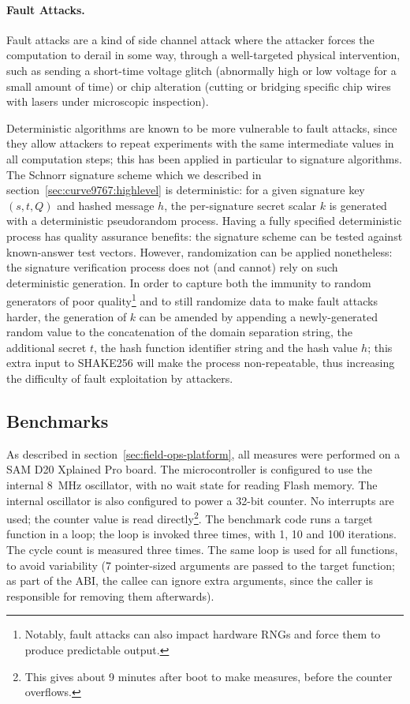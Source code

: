 \documentclass{llncs}
\begin{document}
\paragraph{Fault Attacks.}

Fault attacks are a kind of side channel attack where the attacker
forces the computation to derail in some way, through a well-targeted
physical intervention, such as sending a short-time voltage glitch
(abnormally high or low voltage for a small amount of time) or chip
alteration (cutting or bridging specific chip wires with lasers under
microscopic inspection).

Deterministic algorithms are known to be more vulnerable to fault
attacks, since they allow attackers to repeat experiments with the same
intermediate values in all computation steps; this has been applied in
particular to signature
algorithms\cite{AmbBosFayJoyLocMur2017,PodSomSchLocRos2018}. The Schnorr
signature scheme which we described in
section~\ref{sec:curve9767:highlevel} is deterministic: for a given
signature key $(s,t,Q)$ and hashed message $h$, the per-signature secret
scalar $k$ is generated with a deterministic pseudorandom process.
Having a fully specified deterministic process has quality assurance
benefits: the signature scheme can be tested against known-answer test
vectors\cite{DeterministicECDSArfc}. However, randomization can be
applied nonetheless: the signature verification process does not (and
cannot) rely on such deterministic generation. In order to capture both
the immunity to random generators of poor quality\footnote{Notably,
fault attacks can also impact hardware RNGs and force them to produce
predictable output.} and to still randomize data to make fault attacks
harder, the generation of $k$ can be amended by appending a
newly-generated random value to the concatenation of the domain
separation string, the additional secret $t$, the hash function
identifier string and the hash value $h$; this extra input to SHAKE256
will make the process non-repeatable, thus increasing the difficulty of
fault exploitation by attackers.

\subsection{Benchmarks}

As described in section~\ref{sec:field-ops-platform}, all measures were
performed on a SAM D20 Xplained Pro board. The microcontroller is
configured to use the internal 8~MHz oscillator, with no wait state for
reading Flash memory. The internal oscillator is also configured to
power a 32-bit counter. No interrupts are used; the counter value is
read directly\footnote{This gives about 9 minutes after boot to make
measures, before the counter overflows.}. The benchmark code runs a
target function in a loop; the loop is invoked three times, with 1, 10
and 100 iterations. The cycle count is measured three times. The same
loop is used for all functions, to avoid variability (7 pointer-sized
arguments are passed to the target function; as part of the ABI, the
callee can ignore extra arguments, since the caller is responsible for
removing them afterwards).
\end{document}

